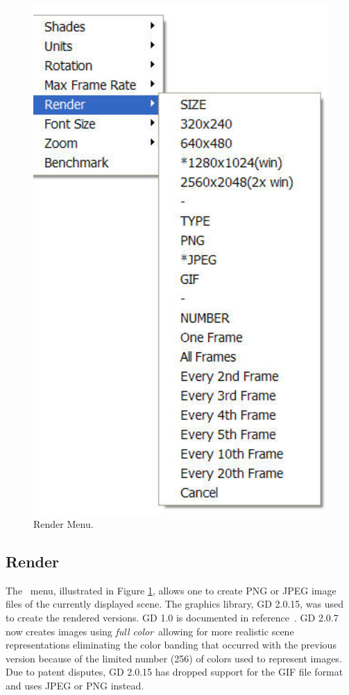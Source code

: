 \documentclass[11pt,twoside]{book}
\newcommand{\figoptions}{hbp}
\newcommand{\frameit}[1]{\fbox{\tt #1}}
\begin{document}
\begin{figure}[\figoptions]
\begin{center}
\includegraphics[width=4.4166666in]{figures/menu_render2}
\caption{Render Menu.} \label{fig_rendermenu}
\end{center}
\end{figure}

\subsection{Render}
The \frameit{Render}\ menu, illustrated in Figure
\ref{fig_rendermenu}, allows one to create PNG or JPEG image files
of the currently displayed scene. The graphics library, GD 2.0.15,
was used to create the rendered versions.  GD 1.0 is documented in
reference~\cite[Appendix 4]{BOUTELL}.  GD 2.0.7 now creates images
using {\em full color}\ allowing for more realistic scene
representations eliminating the color banding that occurred with
the previous version because of the limited number (256) of colors
used to represent images. Due to patent disputes, GD 2.0.15 has
dropped support for the GIF file format and uses JPEG or PNG
instead.
\end{document}
